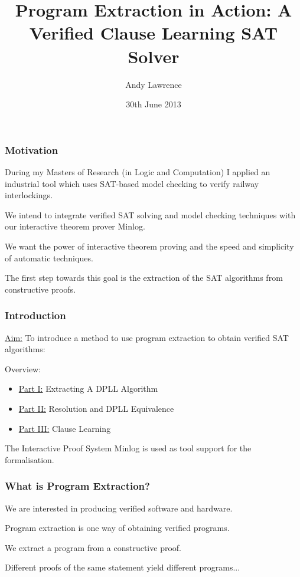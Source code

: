 \documentclass{beamer}
\title{Program Extraction in Action: A Verified Clause Learning SAT Solver}
\author[Andy Lawrence]{Andy Lawrence}
\date{30th June 2013}
\begin{document}
\begin{frame}
\titlepage

\end{frame}



\begin{frame}
\frametitle{Motivation}
During my Masters of Research (in Logic and Computation) I applied an industrial tool which uses SAT-based model checking to verify railway interlockings. \\

\medskip

We intend to integrate verified SAT solving and model checking techniques with our interactive theorem prover Minlog. \\

\medskip

We want the power of interactive theorem proving and the speed and simplicity of automatic techniques. \\


\medskip

The first step towards this goal is the extraction of the SAT algorithms from constructive proofs.


\end{frame}


\begin{frame}

\frametitle{Introduction}
\underline{Aim:} To introduce a method to use program extraction to obtain verified SAT algorithms: \pause

\medskip

Overview:

\begin{itemize}
  \item \underline{Part I:} Extracting A DPLL Algorithm
  \item \underline{Part II:}  Resolution and DPLL Equivalence
  \item \underline{Part III:} Clause Learning
\end{itemize}

\bigskip
The Interactive Proof System Minlog is used as tool support for the formalisation.
\end{frame}


\begin{frame}
\frametitle{What is Program Extraction?}

We are interested in producing verified software and hardware. 

\medskip

\alert{Program extraction} is one way of obtaining verified programs.

\medskip

We extract a program from a constructive proof.

\medskip

Different proofs of the same statement yield different programs...



\end{frame}
\end{document}
